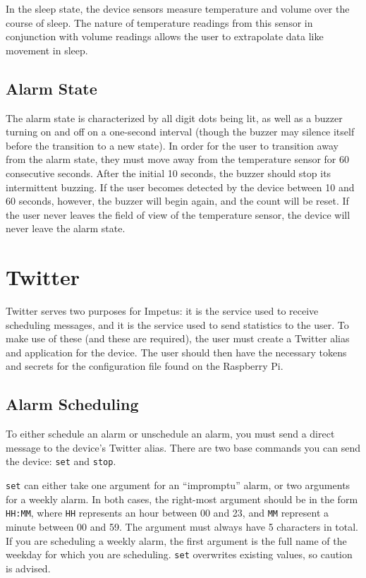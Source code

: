 In the sleep state, the device sensors measure temperature and volume
over the course of sleep. The nature of temperature readings from this
sensor in conjunction with volume readings allows the user to
extrapolate data like movement in sleep.

\subsection{Alarm State}
The alarm state is characterized by all digit dots being lit, as well
as a buzzer turning on and off on a one-second interval (though the
buzzer may silence itself before the transition to a new state). In
order for the user to transition away from the alarm state, they must
move away from the temperature sensor for 60 consecutive
seconds. After the initial 10 seconds, the buzzer should stop its
intermittent buzzing. If the user becomes detected by the device
between 10 and 60 seconds, however, the buzzer will begin again, and
the count will be reset. If the user never leaves the field of view of
the temperature sensor, the device will never leave the alarm state.

\section{Twitter}
Twitter serves two purposes for Impetus: it is the service used to
receive scheduling messages, and it is the service used to send
statistics to the user. To make use of these (and these are required),
the user must create a Twitter alias and application for the
device. The user should then have the necessary tokens and secrets for
the configuration file found on the Raspberry Pi.

\subsection{Alarm Scheduling}
To either schedule an alarm or unschedule an alarm, you must send a
direct message to the device's Twitter alias. There are two base
commands you can send the device: \verb|set| and \verb|stop|.

\verb|set| can either take one argument for an ``impromptu'' alarm, or
two arguments for a weekly alarm. In both cases, the right-most
argument should be in the form \verb|HH:MM|, where \verb|HH|
represents an hour between 00 and 23, and \verb|MM| represent a minute
between 00 and 59. The argument must always have 5 characters in
total. If you are scheduling a weekly alarm, the first argument is the
full name of the weekday for which you are scheduling. \verb|set|
overwrites existing values, so caution is advised.

